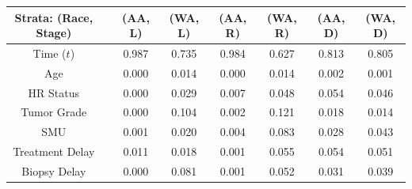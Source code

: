 \begin{tabular}{cccccccc}
\hline
Strata: (Race, Stage) & & (AA, L) & (WA, L) & (AA, R) & (WA, R) & (AA, D) & (WA, D)\\
\hline
Time ($t$) & \vline & 0.987 & 0.735 & 0.984 & 0.627 & 0.813 & 0.805\\
Age & \vline & 0.000 & 0.014 & 0.000 & 0.014 & 0.002 & 0.001\\
HR Status & \vline & 0.000 & 0.029 & 0.007 & 0.048 & 0.054 & 0.046\\
Tumor Grade & \vline & 0.000 & 0.104 & 0.002 & 0.121 & 0.018 & 0.014\\
SMU & \vline & 0.001 & 0.020 & 0.004 & 0.083 & 0.028 & 0.043\\
Treatment Delay & \vline & 0.011 & 0.018 & 0.001 & 0.055 & 0.054 & 0.051\\
Biopsy Delay & \vline & 0.000 & 0.081 & 0.001 & 0.052 & 0.031 & 0.039\\
\hline
\end{tabular}
